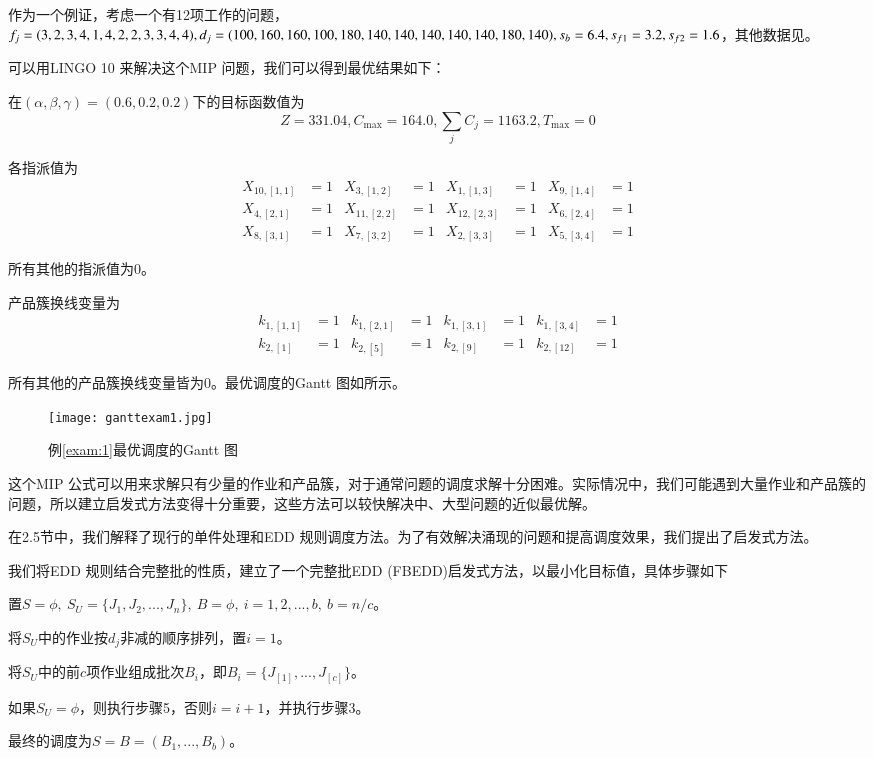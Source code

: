 \begin{example}
作为一个例证，考虑一个有12项工作的问题，$f_j=(3,2,3,4,1,4,2,2,3,3,4,4),d_j=(100,160,160,100,180,\\
140,140,140,140,140,180,140),s_b=6.4,s_{f1}=3.2,s_{f2}=1.6$，其他数据见。\label{exam:1}
\end{example}

可以用LINGO 10 来解决这个MIP 问题，我们可以得到最优结果如下：

在$(\alpha,\beta,\gamma) = (0.6,0.2,0.2)$下的目标函数值为
$$Z = 331.04, C_{\max} = 164.0, {\textstyle\sum_j C_j = 1163.2}, T_{\max} = 0$$

各指派值为
\begin{align*}
 X_{10,[1,1]} & = 1 & X_{3,[1,2]} & = 1 & X_{1,[1,3]} & = 1 & X_{9,[1,4]} & = 1\\
 X_{4,[2,1]} & = 1 & X_{11,[2,2]} & = 1 & X_{12,[2,3]} & = 1 & X_{6,[2,4]} & = 1\\
 X_{8,[3,1]} & = 1 & X_{7,[3,2]} & = 1 & X_{2,[3,3]} & = 1 & X_{5,[3,4]} & = 1
\end{align*}

所有其他的指派值为0。

产品簇换线变量为
\begin{align*}
k_{1,[1,1]} & = 1 & k_{1,[2,1]} & = 1 & k_{1,[3,1]} & = 1 & k_{1,[3,4]} & = 1 \\
k_{2,[1]} & = 1 & k_{2,[5]} & = 1 & k_{2,[9]} & = 1 & k_{2,[12]} & = 1
\end{align*}

所有其他的产品簇换线变量皆为0。最优调度的Gantt 图如所示。
\begin{figure}[h]
\texttt{[image: ganttexam1.jpg]}
\caption{例\ref{exam:1}最优调度的Gantt 图\label{fig:gantt1}}
\end{figure}

这个MIP 公式可以用来求解只有少量的作业和产品簇，对于通常问题的调度求解十分困难。实际情况中，我们可能遇到大量作业和产品簇的问题，所以建立启发式方法变得十分重要，这些方法可以较快解决中、大型问题的近似最优解。

在2.5节中，我们解释了现行的单件处理和EDD 规则调度方法。为了有效解决涌现的问题和提高调度效果，我们提出了启发式方法。
\newcommand{\Step}{{\heiti 步骤}}

我们将EDD 规则结合完整批的性质，建立了一个完整批EDD (FBEDD)启发式方法，以最小化目标值，具体步骤如下

\begin{asparaenum}
\renewcommand{\labelenumi}{\heiti 步骤\theenumi~}
\item 置$S=\phi,\ S_U = \{J_1,J_2,...,J_n\},\ B=\phi,\ i=1,2,...,b,\ b = n/c$。
\item 将$S_U$中的作业按$d_j$非减的顺序排列，置$i=1$。
\item 将$S_U$中的前$c$项作业组成批次$B_i$，即$B_i = \{J_{[1]},...,J_{[c]}\}$。
\item 如果$S_U = \phi$，则执行\Step5，否则$i=i+1$，并执行\Step 3。
\item 最终的调度为$S=B=(B_1,...,B_b)$。
\end{asparaenum}

